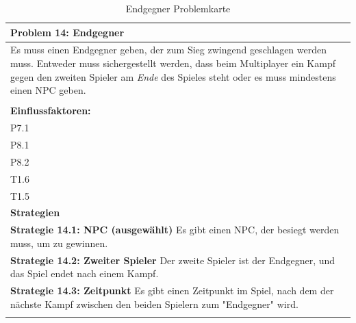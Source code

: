\documentclass[fontsize=12pt,paper=a4,twoside]{scrartcl}
\begin{document}
\begin{table}[H]
    \centering
    \begin{tabular}{|p{15cm}|}
    \hline
          \textbf{Problem 14: Endgegner}  \\ \hline
	Es muss einen Endgegner geben, der zum Sieg zwingend geschlagen werden muss. Entweder muss sichergestellt werden, dass beim Multiplayer ein Kampf gegen den zweiten Spieler am \textit{Ende} des Spieles steht oder es muss mindestens einen NPC geben. \\
         \\ \hline
          \textbf{Einflussfaktoren: } \\
	P7.1 \\
	P8.1 \\
	P8.2 \\
	T1.6 \\
	T1.5 \\
          \hline
          \textbf{Strategien} \\ \hline
            {}          
           \label{strategie:14.1}     
          \textbf{Strategie 14.1: NPC (ausgewählt)} Es gibt einen NPC, der besiegt werden muss, um zu gewinnen.  \\        
  {}          
           \label{strategie:14.2}              
          \textbf{Strategie 14.2: Zweiter Spieler} Der zweite Spieler ist der Endgegner, und das Spiel endet nach einem Kampf.  \\
	 {}          
           \label{strategie:14.3}     
          \textbf{Strategie 14.3: Zeitpunkt} Es gibt einen Zeitpunkt im Spiel, nach dem der nächste Kampf zwischen den beiden Spielern zum "Endgegner" wird.  \\ 
	 \\ \hline
    \end{tabular}

    \caption{Endgegner Problemkarte}
    \label{tab:ProblemKarte14}
\end{table}
\end{document}
